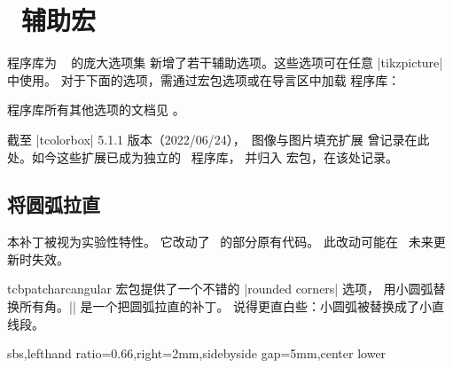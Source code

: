 \clearpage
\section{\tikzname\ 辅助宏}\label{sec:tikzimagefilling}%
%
 程序库为 \tikzname\ \cite{tantau:tikz_and_pgf} 的庞大选项集
新增了若干辅助选项。这些选项可在任意 |tikzpicture| 中使用。
对于下面的选项，需通过宏包选项或在导言区中加载  程序库：
\begin{dispListing}
\end{dispListing}

 程序库所有其他选项的文档见 。

\begin{marker}
截至 |tcolorbox| 5.1.1 版本（2022/06/24），\tikzname\ 图像与图片填充扩展
曾记录在此处。如今这些扩展已成为独立的 \tikzname\ 程序库，
并归入  宏包，在该处记录。
\end{marker}


\subsection{将圆弧拉直}

\begin{marker}
本补丁被视为实验性特性。
它改动了 \tikzname\ 的部分原有代码。
此改动可能在 \tikzname\ 未来更新时失效。
\end{marker}

\begin{docCommand}[doc new=2014-05-05]{tcbpatcharcangular}{}
   宏包提供了一个不错的 |rounded corners| 选项，
  用小圆弧替换所有角。|\tcbpatcharcangular| 是一个把圆弧拉直的补丁。
  说得更直白些：小圆弧被替换成了小直线段。

\begin{dispExample*}{sbs,lefthand ratio=0.66,right=2mm,sidebyside gap=5mm,center lower}
\end{dispExample*}

\end{docCommand}


